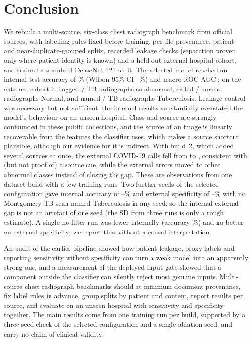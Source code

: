 \section{Conclusion}
\label{sec:conclusion}

We rebuilt a multi-source, six-class chest radiograph benchmark from official sources, with labelling rules fixed before training, per-file provenance, patient- and near-duplicate-grouped splits, recorded leakage checks (separation proven only where patient identity is known) and a held-out external hospital cohort, and trained a standard DenseNet-121 on it. The selected model reached an internal test accuracy of \RTestAcc\% (Wilson 95\% CI \RTestAccLo--\RTestAccHi\%) and macro ROC-AUC \RTestMacroAUC; on the external cohort it flagged \RExtSensK/\RExtSensN{} TB radiographs as abnormal, called \RExtSpecK/\RExtSpecN{} normal radiographs Normal, and named \RExtTBK/\RExtTBN{} TB radiographs Tuberculosis. Leakage control was necessary but not sufficient: the internal results substantially overstated the model's behaviour on an unseen hospital. Class and source are strongly confounded in these public collections, and the source of an image is linearly recoverable from the features the classifier uses, which makes a source shortcut plausible, although our evidence for it is indirect. With build~2, which added several sources at once, the external COVID-19 calls fell from \RRunOneExtCovidCalls{} to \RExtCovidCalls, consistent with (but not proof of) a source cue, while the external errors moved to other abnormal classes instead of closing the gap. These are observations from one dataset build with a few training runs. Two further seeds of the selected configuration gave internal accuracy of \RMSTestAccMin--\RMSTestAccMax\% and external specificity of \RMSExtSpecMin--\RMSExtSpecMax\% with no Montgomery TB scan named Tuberculosis in any seed, so the internal-external gap is not an artefact of one seed (the SD from three runs is only a rough estimate). A single no-filter run was lower internally (accuracy \RAblTestAcc\%) and no better on external specificity; we report this without a causal interpretation.

An audit of the earlier pipeline showed how patient leakage, proxy labels and reporting sensitivity without specificity can turn a weak model into an apparently strong one, and a measurement of the deployed input gate showed that a component outside the classifier can silently reject most genuine inputs. Multi-source chest radiograph benchmarks should at minimum document provenance, fix label rules in advance, group splits by patient and content, report results per source, and evaluate on an unseen hospital with sensitivity and specificity together. The main results come from one training run per build, supported by a three-seed check of the selected configuration and a single ablation seed, and carry no claim of clinical validity.
